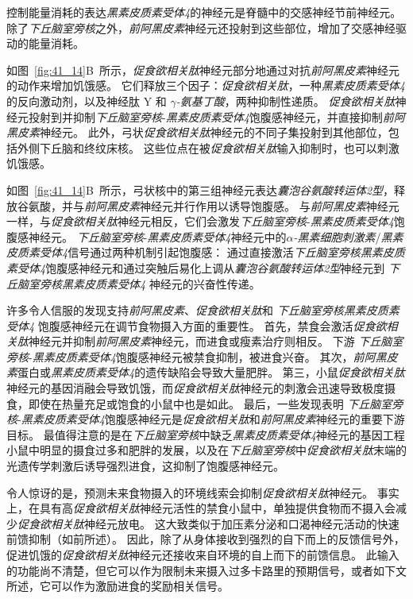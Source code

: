 控制能量消耗的表达\textit{黑素皮质素受体4}的神经元是脊髓中的交感神经节前神经元。
除了\textit{下丘脑室旁核}之外，\textit{前阿黑皮素}神经元还投射到这些部位，增加了交感神经驱动的能量消耗。


如图~\ref{fig:41_14}B~所示，\textit{促食欲相关肽}神经元部分地通过对抗\textit{前阿黑皮素}神经元的动作来增加饥饿感。
它们释放三个因子：\textit{促食欲相关肽}，一种\textit{黑素皮质素受体4}的反向激动剂，以及神经肽 Y 和 \textit{$ \gamma $-氨基丁酸}，两种抑制性递质。
\textit{促食欲相关肽}神经元投射到并抑制\textit{下丘脑室旁核}-\textit{黑素皮质素受体4}饱腹感神经元，并直接抑制\textit{前阿黑皮素}神经元。
此外，弓状\textit{促食欲相关肽}神经元的不同子集投射到其他部位，包括外侧下丘脑和终纹床核。
这些位点在被\textit{促食欲相关肽}输入抑制时，也可以刺激饥饿感。


如图~\ref{fig:41_14}B~所示，弓状核中的第三组神经元表达\textit{囊泡谷氨酸转运体2型}，释放谷氨酸，并与\textit{前阿黑皮素}神经元并行作用以诱导饱腹感。
与\textit{前阿黑皮素}神经元一样，与\textit{促食欲相关肽}神经元相反，它们会激发\textit{下丘脑室旁核}-\textit{黑素皮质素受体4}饱腹感神经元。
\textit{下丘脑室旁核}-\textit{黑素皮质素受体4}神经元中的\textit{$\alpha$-黑素细胞刺激素}/\textit{黑素皮质素受体4}信号通过两种机制引起饱腹感：
通过直接激活\textit{下丘脑室旁核}\textit{黑素皮质素受体4}饱腹感神经元和通过突触后易化上调从\textit{囊泡谷氨酸转运体2型}神经元到 \textit{下丘脑室旁核}\textit{黑素皮质素受体4} 神经元的兴奋性传递。


许多令人信服的发现支持\textit{前阿黑皮素}、\textit{促食欲相关肽}和 \textit{下丘脑室旁核}\textit{黑素皮质素受体4} 饱腹感神经元在调节食物摄入方面的重要性。
首先，禁食会激活\textit{促食欲相关肽}神经元并抑制\textit{前阿黑皮素}神经元，而进食或瘦素治疗则相反。
下游 \textit{下丘脑室旁核}-\textit{黑素皮质素受体4}饱腹感神经元被禁食抑制，被进食兴奋。
其次，\textit{前阿黑皮素}蛋白或\textit{黑素皮质素受体4}的遗传缺陷会导致大量肥胖。
第三，小鼠\textit{促食欲相关肽}神经元的基因消融会导致饥饿，而\textit{促食欲相关肽}神经元的刺激会迅速导致极度摄食，即使在热量充足或饱食的小鼠中也是如此。
最后，一些发现表明 \textit{下丘脑室旁核}-\textit{黑素皮质素受体4}饱腹感神经元是\textit{促食欲相关肽}和\textit{前阿黑皮素}神经元的重要下游目标。
最值得注意的是在\textit{下丘脑室旁核}中缺乏\textit{黑素皮质素受体4}神经元的基因工程小鼠中明显的摄食过多和肥胖的发展，以及在\textit{下丘脑室旁核}中\textit{促食欲相关肽}末端的光遗传学刺激后诱导强烈进食，这抑制了饱腹感神经元。


令人惊讶的是，预测未来食物摄入的环境线索会抑制\textit{促食欲相关肽}神经元。
事实上，在具有高\textit{促食欲相关肽}神经元活性的禁食小鼠中，单独提供食物而不摄入会减少\textit{促食欲相关肽}神经元放电。
这大致类似于加压素分泌和口渴神经元活动的快速前馈抑制（如前所述）。
因此，除了从身体接收到强烈的自下而上的反馈信号外，促进饥饿的\textit{促食欲相关肽}神经元还接收来自环境的自上而下的前馈信息。
此输入的功能尚不清楚，但它可以作为限制未来摄入过多卡路里的预期信号，或者如下文所述，它可以作为激励进食的奖励相关信号。


